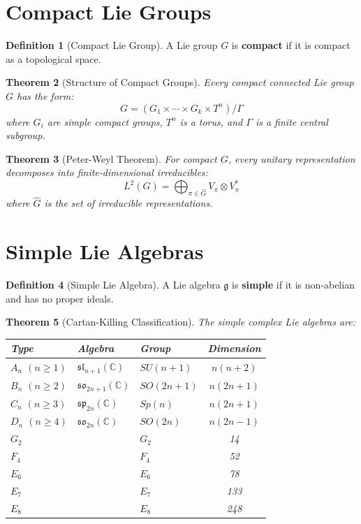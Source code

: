 \documentclass[11pt,a4paper,openright]{book}
\theoremstyle{plain}
\newtheorem{theorem}{Theorem}[chapter]
\theoremstyle{definition}
\newtheorem{definition}[theorem]{Definition}
\newcommand{\C}{\mathbb{C}}
\newcommand{\g}{\mathfrak{g}}
\begin{document}
\section{Compact Lie Groups}

\begin{definition}[Compact Lie Group]
A Lie group $G$ is \textbf{compact} if it is compact as a topological space.
\end{definition}

\begin{theorem}[Structure of Compact Groups]
Every compact connected Lie group $G$ has the form:
\begin{equation}
G = (G_1 \times \cdots \times G_k \times T^n) / \Gamma
\end{equation}
where $G_i$ are simple compact groups, $T^n$ is a torus, and $\Gamma$ is a finite central subgroup.
\end{theorem}

\begin{theorem}[Peter-Weyl Theorem]
For compact $G$, every unitary representation decomposes into finite-dimensional irreducibles:
\begin{equation}
L^2(G) = \bigoplus_{\pi \in \hat{G}} V_\pi \otimes V_\pi^*
\end{equation}
where $\hat{G}$ is the set of irreducible representations.
\end{theorem}

\section{Simple Lie Algebras}

\begin{definition}[Simple Lie Algebra]
A Lie algebra $\g$ is \textbf{simple} if it is non-abelian and has no proper ideals.
\end{definition}

\begin{theorem}[Cartan-Killing Classification]
The simple complex Lie algebras are:
\begin{center}
\begin{tabular}{lllc}
\toprule
\textbf{Type} & \textbf{Algebra} & \textbf{Group} & \textbf{Dimension} \\
\midrule
$A_n$ $(n \geq 1)$ & $\mathfrak{sl}_{n+1}(\C)$ & $SU(n+1)$ & $n(n+2)$ \\
$B_n$ $(n \geq 2)$ & $\mathfrak{so}_{2n+1}(\C)$ & $SO(2n+1)$ & $n(2n+1)$ \\
$C_n$ $(n \geq 3)$ & $\mathfrak{sp}_{2n}(\C)$ & $Sp(n)$ & $n(2n+1)$ \\
$D_n$ $(n \geq 4)$ & $\mathfrak{so}_{2n}(\C)$ & $SO(2n)$ & $n(2n-1)$ \\
\midrule
$G_2$ & & $G_2$ & 14 \\
$F_4$ & & $F_4$ & 52 \\
$E_6$ & & $E_6$ & 78 \\
$E_7$ & & $E_7$ & 133 \\
$E_8$ & & $E_8$ & 248 \\
\bottomrule
\end{tabular}
\end{center}
\end{theorem}
\end{document}
